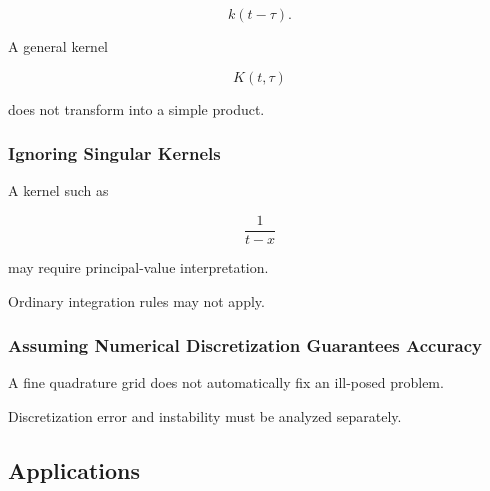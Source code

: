 \[
k(t-\tau).
\]

A general kernel

\[
K(t,\tau)
\]

does not transform into a simple product.

\subsubsection{Ignoring Singular Kernels}

A kernel such as

\[
\frac1{t-x}
\]

may require principal-value interpretation.

Ordinary integration rules may not apply.

\subsubsection{Assuming Numerical Discretization Guarantees Accuracy}

A fine quadrature grid does not automatically fix an ill-posed problem.

Discretization error and instability must be analyzed separately.

\subsection{Applications}
\label{subsec:integral-equation-applications}

